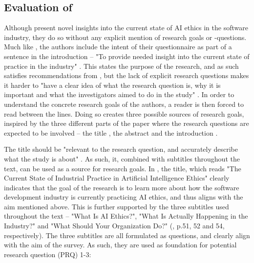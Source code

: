 \subsection[Evaluation of Vakkuri et al. (2020)]{Evaluation of \textcite{Vakkuri_2020}}
\label{sec:vakkuri-evaluation}
Although \textcite{Vakkuri_2020} present novel insights into the current state of AI ethics in the software industry, they do so without any explicit mention of research goals or -questions. Much like \textcite{Barredo_2020}, the authors include the intent of their questionnaire as part of a sentence in the introduction -- "To provide needed insight into the current state of practice in the industry" \parencite[p.51]{Vakkuri_2020}. This states the purpose of the research, and as such satisfies recommendations from \textcite[p.359]{Davidson_2012}, but the lack of explicit research questions makes it harder to "have a clear idea of what the research question is, why it is important and what the investigators aimed to do in the study" \parencite[p.360]{Davidson_2012}. In order to understand the concrete research goals of the authors, a reader is then forced to read between the lines. Doing so creates three possible sources of research goals, inspired by the three different parts of the paper where the research questions are expected to be involved -- the title \parencite[p.359]{Davidson_2012}, the abstract \parencite[p.115]{Cuschieri_2019} and the introduction \parencite[p.2]{Jha_2014}.

The title should be "relevant to the research question, and accurately describe what the study is about" \parencite[p.359]{Davidson_2012}. As such, it, combined with subtitles throughout the text, can be used as a source for research goals. In \textcite{Vakkuri_2020}, the title, which reads "The Current State of Industrial Practice in Artificial Intelligence Ethics" clearly indicates that the goal of the research is to learn more about how the software development industry is currently practicing AI ethics, and thus aligns with the aim mentioned above. This is further supported by the three subtitles used throughout the text -- "What Is AI Ethics?", "What Is Actually Happening in the Industry?" and "What Should Your Organization Do?" (\cite{Vakkuri_2020}, p.51, 52 and 54, respectively). The three subtitles are all formulated as questions, and clearly align with the aim of the survey. As such, they are used as foundation for potential research question (PRQ) 1-3:

